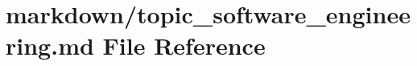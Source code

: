 \hypertarget{topic__software__engineering_8md}{}\section{markdown/topic\+\_\+software\+\_\+engineering.md File Reference}
\label{topic__software__engineering_8md}
